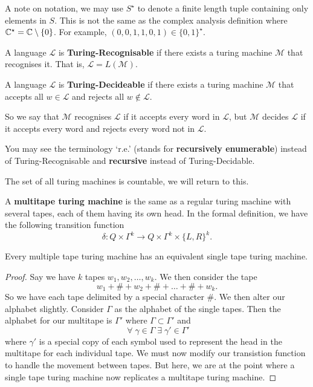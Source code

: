 
A note on notation, we may use $S^\star$ to denote a finite length tuple containing only elements in $S$. This is not the same as the complex analysis definition where $\mathbb{C}^\star = \mathbb{C} \setminus \{0\}$. For example, $(0, 0, 1, 1, 0 ,1) \in \{ 0, 1 \}^\star$.

\begin{definition}[]
    A language $\mathcal L$ is \textbf{Turing-Recognisable} if there exists a turing machine $\mathcal M$ that recognises it. That is, $\mathcal L = L(\mathcal M)$.
\end{definition}

\begin{definition}[]
    A language $\mathcal L$ is \textbf{Turing-Decideable} if there exists a turing machine $\mathcal M$ that accepts all $w \in \mathcal L$ and rejects all $w \not \in \mathcal L$.
\end{definition}

So we say that $\mathcal M$ recognises $\mathcal L$ if it accepts every word in $\mathcal L$, but $\mathcal M$ decides $\mathcal L$ if it accepts every word and rejects every word not in $\mathcal L$.

You may see the terminology `r.e.' (stands for \textbf{recursively enumerable}) instead of Turing-Recognisable and \textbf{recursive} instead of Turing-Decidable.

\begin{remark}
    The set of all turing machines is countable, we will return to this.
\end{remark}

\begin{definition}
    A \textbf{multitape turing machine} is the same as a regular turing machine with several tapes, each of them having its own head. In the formal definition, we have the following transition function \[ \delta : Q \times \Gamma^k \to Q \times \Gamma^k \times \{ L, R \}^k. \] 
\end{definition}

\begin{theorem}[]
    Every multiple tape turing machine has an equivalent single tape turing machine.
\end{theorem}

\begin{proof}
    Say we have $k$ tapes $w_1, w_2, \ldots, w_k$. We then consider the tape \[w_1 + \# + w_2 + \# + \ldots + \# + w_k.\] So we have each tape delimited by a special character $\#$. We then alter our alphabet slightly. Consider $\Gamma$ as the alphabet of the single tapes. Then the alphabet for our multitape is $\Gamma'$ where $\Gamma \subset \Gamma'$ and \[ \; \forall \; \gamma \in \Gamma \; \exists \; \gamma' \in \Gamma'\] where $\gamma'$ is a special copy of each symbol used to represent the head in the multitape for each individual tape. We must now modify our transistion function to handle the movement between tapes. But here, we are at the point where a single tape turing machine now replicates a multitape turing machine.
\end{proof}

